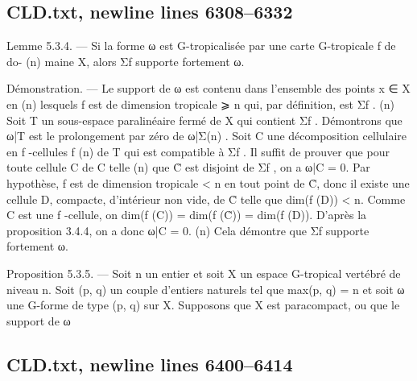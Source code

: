 \documentclass[
  10pt,
]{article}
\newenvironment{Shaded}{}{}
\newcommand{\NormalTok}[1]{#1}
\begin{document}
\subsection{CLD.txt, newline lines
6308--6332}\label{cld.txt-newline-lines-63086332}

\begin{Shaded}
\begin{Highlighting}[]
\NormalTok{Lemme 5.3.4. — Si la forme ω est G{-}tropicalisée par une carte G{-}tropicale f de do{-}}
\NormalTok{                (n)}
\NormalTok{maine X, alors Σf supporte fortement ω.}

\NormalTok{Démonstration. — Le support de ω est contenu dans l’ensemble des points x ∈ X en}
\NormalTok{                                                                    (n)}
\NormalTok{lesquels f est de dimension tropicale ⩾ n qui, par définition, est Σf .}
\NormalTok{                                                                  (n)}
\NormalTok{  Soit T un sous{-}espace paralinéaire fermé de X qui contient Σf . Démontrons que ω|T}
\NormalTok{est le prolongement par zéro de ω|Σ(n) . Soit C une décomposition cellulaire en f {-}cellules}
\NormalTok{                                     f}
\NormalTok{                             (n)}
\NormalTok{de T qui est compatible à Σf . Il suffit de prouver que pour toute cellule C de C      telle}
\NormalTok{                        (n)}
\NormalTok{que C̊ est disjoint de Σf , on a ω|C = 0.}
\NormalTok{  Par hypothèse, f est de dimension tropicale \textless{} n en tout point de C̊, donc il existe une}
\NormalTok{cellule D, compacte, d’intérieur non vide, de C̊ telle que dim(f (D)) \textless{} n. Comme C est}
\NormalTok{une f {-}cellule, on dim(f (C)) = dim(f (C̊)) = dim(f (D)). D’après la proposition 3.4.4, on}
\NormalTok{a donc ω|C = 0.}
\NormalTok{                          (n)}
\NormalTok{  Cela démontre que Σf supporte fortement ω.}

\NormalTok{Proposition 5.3.5. — Soit n un entier et soit X un espace G{-}tropical vertébré de}
\NormalTok{niveau n. Soit (p, q) un couple d’entiers naturels tel que max(p, q) = n et soit ω une}
\NormalTok{G{-}forme de type (p, q) sur X. Supposons que X est paracompact, ou que le support de ω}
\end{Highlighting}
\end{Shaded}

\subsection{CLD.txt, newline lines
6400--6414}\label{cld.txt-newline-lines-64006414}
\end{document}
